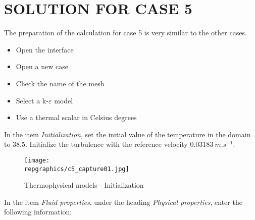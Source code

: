 %
%
%
%
%
%
%
\section{SOLUTION FOR CASE 5}
The preparation of the calculation for case 5 is very similar to the other cases.
\begin{itemize}
        \item Open the \CS interface
        \item Open a new case
        \item Check the name of the mesh
        \item Select a k-$\varepsilon$ model
        \item Use a thermal scalar in Celsius degrees
\end{itemize}

In the item {\itshape Initialization}, set the initial value of the temperature
in the domain to 38.5\degresC. Initialize the turbulence with the reference
velocity $0.03183\ m.s^{-1}$.

\begin{figure}[h!]
\begin{center}
\texttt{[image: \\repgraphics/c5\_capture01.jpg]}
\caption{Thermophysical models - Initialization}
\label{fig1_e5}
\end{center}
\end{figure}


\newpage
In the item {\itshape Fluid properties}, under the heading {\itshape Physical
properties}, enter the following information:

